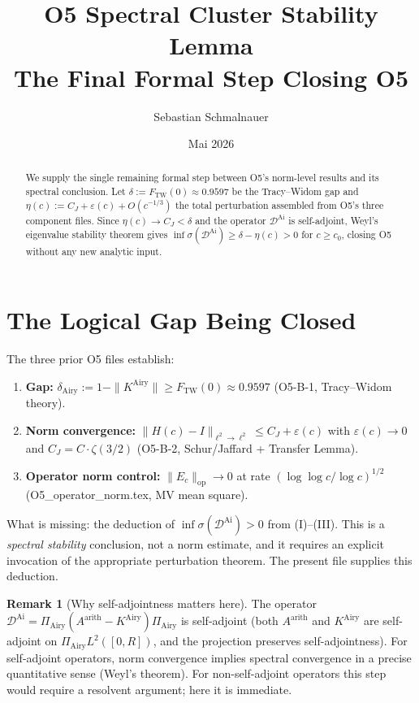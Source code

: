 \documentclass[12pt,a4paper]{amsart}
\title{O5 Spectral Cluster Stability Lemma\\
{\normalsize The Final Formal Step Closing O5}}
\author{Sebastian Schmalnauer}
\date{Mai 2026}
\theoremstyle{definition}
\newtheorem{remark}[theorem]{Remark}
\newcommand{\KAi}{K^{\mathrm{Airy}}}
\newcommand{\DAi}{\mathcal{D}^{\mathrm{Ai}}}
\newcommand{\PAi}{\Pi_{\mathrm{Airy}}}
\newcommand{\Aarith}{A^{\mathrm{arith}}}
\newcommand{\norm}[1]{\|#1\|}
\begin{document}
\maketitle

\begin{abstract}
We supply the single remaining formal step between O5's norm-level
results and its spectral conclusion.
Let $\delta := F_{\mathrm{TW}}(0) \approx 0.9597$ be the Tracy--Widom
gap and $\eta(c) := C_J + \varepsilon(c) + O(c^{-1/3})$ the total
perturbation assembled from O5's three component files.
Since $\eta(c) \to C_J < \delta$ and the operator $\DAi$ is self-adjoint,
Weyl's eigenvalue stability theorem gives
$\inf\sigma(\DAi) \ge \delta - \eta(c) > 0$ for $c \ge c_0$,
closing O5 without any new analytic input.
\end{abstract}

\section{The Logical Gap Being Closed}
\label{sec:gap}

The three prior O5 files establish:

\begin{enumerate}[label=(\Roman*)]
\item \textbf{Gap:} $\delta_{\mathrm{Airy}} := 1 - \norm{\KAi} \ge F_{\mathrm{TW}}(0) \approx 0.9597$
  (O5-B-1, Tracy--Widom theory).
\item \textbf{Norm convergence:} $\norm{H(c) - I}_{\ell^2 \to \ell^2} \le C_J + \varepsilon(c)$
  with $\varepsilon(c) \to 0$ and $C_J = C\cdot\zeta(3/2)$
  (O5-B-2, Schur/Jaffard + Transfer Lemma).
\item \textbf{Operator norm control:} $\norm{E_c}_{\mathrm{op}} \to 0$
  at rate $(\log\log c / \log c)^{1/2}$
  (O5\_operator\_norm.tex, MV mean square).
\end{enumerate}

What is missing: the deduction of $\inf\sigma(\DAi) > 0$
from (I)--(III).
This is a \emph{spectral stability} conclusion, not a norm estimate,
and it requires an explicit invocation of the appropriate perturbation theorem.
The present file supplies this deduction.

\begin{remark}[Why self-adjointness matters here]
The operator $\DAi = \PAi(\Aarith - \KAi)\PAi$ is self-adjoint
(both $\Aarith$ and $\KAi$ are self-adjoint on $\PAi L^2([0,R])$,
and the projection preserves self-adjointness).
For self-adjoint operators, norm convergence implies spectral convergence
in a precise quantitative sense (Weyl's theorem).
For non-self-adjoint operators this step would require a resolvent argument;
here it is immediate.
\end{remark}
\end{document}
